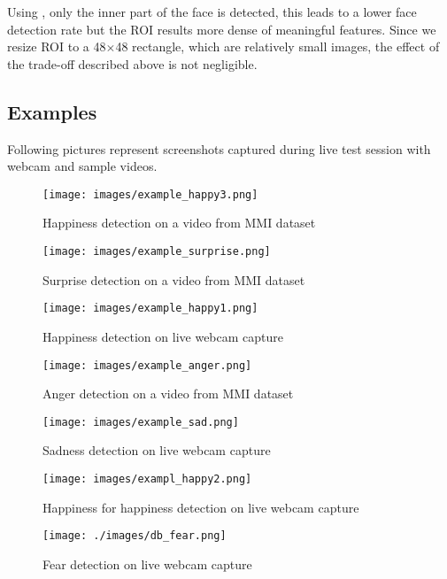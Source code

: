 Using , only the inner part of the face is detected, this leads to a lower face detection rate but the ROI results more dense of meaningful features. Since we resize ROI to a 48$\times$48 rectangle, which are relatively small images, the effect of the trade-off described above is not negligible.

\subsection{Examples}

Following pictures represent screenshots captured during live test session with webcam and sample videos.

\begin{figure}
\centering
\texttt{[image: images/example\_happy3.png]}
\label{fig:example_happy3}
\caption{Happiness detection on a video from MMI dataset}
\end{figure}

\begin{figure}
\centering
\texttt{[image: images/example\_surprise.png]}
\label{fig:example_surprise}
\caption{Surprise detection on a video from MMI dataset}
\end{figure}

\begin{figure}
\centering
\texttt{[image: images/example\_happy1.png]}
\label{fig:example_happy1}
\caption{Happiness detection on live webcam capture}
\end{figure}

\begin{figure}
\centering
\texttt{[image: images/example\_anger.png]}
\label{fig:example_anger}
\caption{Anger detection on a video from MMI dataset}
\end{figure}

\begin{figure}
\centering
\texttt{[image: images/example\_sad.png]}
\label{fig:example_sad}
\caption{Sadness detection on live webcam capture}
\end{figure}

\begin{figure}
\centering
\texttt{[image: images/exampl\_happy2.png]}
\label{fig:exampl_happy2}
\caption{Happiness for happiness detection on live webcam capture}
\end{figure}

\begin{figure}
  \centering
  \texttt{[image: ./images/db\_fear.png]}
  \caption{Fear detection on live webcam capture}
  \label{fig:exampl_fear}
\end{figure}

